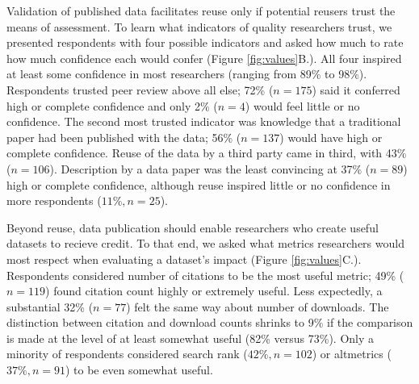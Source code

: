 \documentclass[10pt]{article}
\begin{document}
Validation of published data facilitates reuse only if potential reusers trust the means of assessment.
To learn what indicators of quality researchers trust, we presented respondents with four possible indicators and asked how much to rate how much confidence each would confer (Figure \ref{fig:values}B.).
All four inspired at least some confidence in most researchers (ranging from 89\% to 98\%).
Respondents trusted peer review above all else; 72\% ($n=175$) said it conferred high or complete confidence and only 2\% ($n=4$) would feel little or no confidence.
The second most trusted indicator was knowledge that a traditional paper had been published with the data; 56\% ($n=137$) would have high or complete confidence.
Reuse of the data by a third party came in third, with 43\% ($n=106$). 
Description by a data paper was the least convincing at 37\% ($n=89$) high or complete confidence, although reuse inspired little or no confidence in more respondents ($11\%, n=25$).

Beyond reuse, data publication should enable researchers who create useful datasets to recieve credit.
To that end, we asked what metrics researchers would most respect when evaluating a dataset's impact (Figure \ref{fig:values}C.).
Respondents considered number of citations to be the most useful metric; 49\% ($n=119$) found citation count highly or extremely useful. 
Less expectedly, a substantial 32\% ($n=77$) felt the same way about number of downloads.
The distinction between citation and download counts shrinks to 9\% if the comparison is made at the level of at least somewhat useful (82\% versus 73\%).
Only a minority of respondents considered search rank ($42\%, n=102$) or altmetrics ($37\%, n=91$) to be even somewhat useful.
\end{document}

